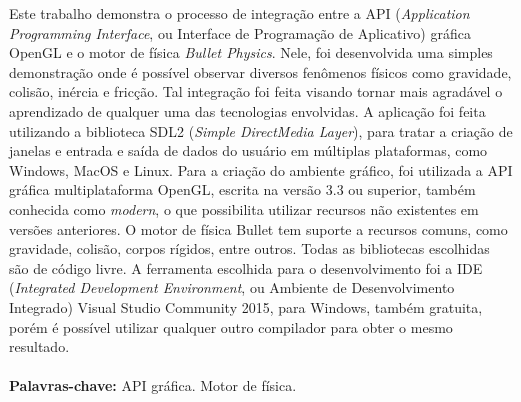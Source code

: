 \documentclass[brazil,ruledheader]{abntifes}
\begin{document}



\vfill 
\null


\begin{resumo}
Este trabalho demonstra o processo de integração entre a API (\textit{Application Programming Interface}, ou Interface de Programação de Aplicativo) gráfica OpenGL e o motor de física \textit{Bullet Physics}. Nele, foi desenvolvida uma simples demonstração onde é possível observar diversos fenômenos físicos como gravidade, colisão, inércia e fricção. Tal integração foi feita visando tornar mais agradável o aprendizado de qualquer uma das tecnologias envolvidas. A aplicação foi feita utilizando a biblioteca SDL2 (\textit{Simple DirectMedia Layer}), para tratar a criação de janelas e entrada e saída de dados do usuário em múltiplas plataformas, como Windows, MacOS e Linux. Para a criação do ambiente gráfico, foi utilizada a API gráfica multiplataforma OpenGL, escrita na versão 3.3 ou superior, também conhecida como \textit{modern}, o que possibilita utilizar recursos não existentes em versões anteriores. O motor de física Bullet tem suporte a recursos comuns, como gravidade, colisão, corpos rígidos, entre outros. Todas as bibliotecas escolhidas são de código livre. A ferramenta escolhida para o desenvolvimento foi a IDE (\textit{Integrated Development Environment}, ou Ambiente de Desenvolvimento Integrado) Visual Studio Community 2015, para Windows, também gratuita, porém é possível utilizar qualquer outro compilador para obter o mesmo resultado.
\\\\\textbf{Palavras-chave:} API gráfica. Motor de física.
\end{resumo}
\end{document}
